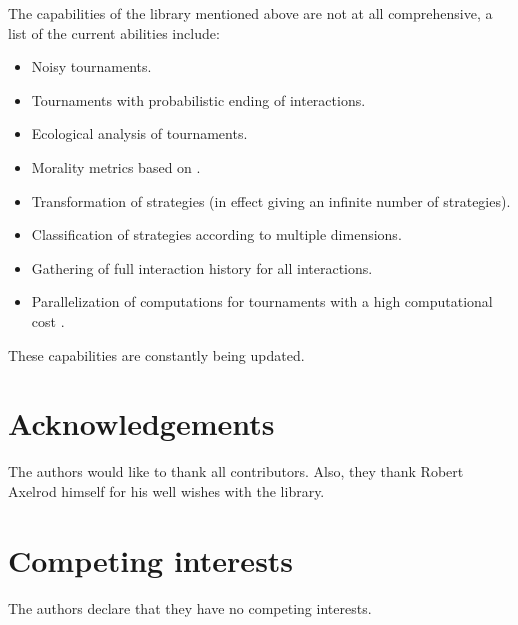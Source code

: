 \documentclass{jors}
\begin{document}
The capabilities of the library mentioned above are not at all comprehensive, a
list of the current abilities include:

\begin{itemize}[noitemsep,topsep=0pt]
    \item Noisy tournaments.
    \item Tournaments with probabilistic ending of interactions.
    \item Ecological analysis of tournaments.
    \item Morality metrics based on \cite{Singer-Clark2014}.
    \item Transformation of strategies (in effect giving an infinite number of
        strategies).
    \item Classification of strategies according to multiple dimensions.
    \item Gathering of full interaction history for all interactions.
    \item Parallelization of computations for tournaments with a high
        computational cost \cite{Pathos, Mckerns2011}.
\end{itemize}

These capabilities are constantly being updated.

\section*{Acknowledgements}

The authors would like to thank all contributors. Also, they thank
Robert Axelrod himself for his well wishes with the library.

\section*{Competing interests}

The authors declare that they have no competing interests.

\printbibliography
%
%
\end{document}

